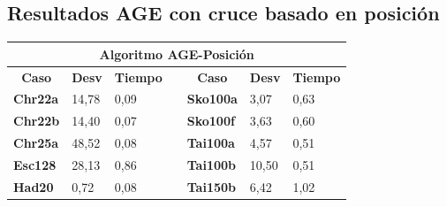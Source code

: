 \documentclass[a4paper, 12pt]{article}
\begin{document}
      
      \newpage
      \subsection{Resultados AGE con cruce basado en posición}
      \begin{table}[H]
\centering
\label{my-label}
\begin{tabular}{|l|l|l|l|l|l|l|}
\hline
\multicolumn{7}{|c|}{\textbf{Algoritmo AGE-Posición}}                                                                                                                                                                                                                   \\ \hline
\multicolumn{1}{|c|}{\textbf{Caso}} & \multicolumn{1}{c|}{\textbf{Desv}} & \multicolumn{1}{c|}{\textbf{Tiempo}} & \multicolumn{1}{c|}{\textbf{}} & \multicolumn{1}{c|}{\textbf{Caso}} & \multicolumn{1}{c|}{\textbf{Desv}} & \multicolumn{1}{c|}{\textbf{Tiempo}} \\ \cline{1-3} \cline{5-7} 
\textbf{Chr22a}                     & 14,78                              & 0,09                                 &                                & \textbf{Sko100a}                   & 3,07                               & 0,63                                 \\ \cline{1-3} \cline{5-7} 
\textbf{Chr22b}                     & 14,40                              & 0,07                                 &                                & \textbf{Sko100f}                   & 3,63                               & 0,60                                 \\ \cline{1-3} \cline{5-7} 
\textbf{Chr25a}                     & 48,52                              & 0,08                                 &                                & \textbf{Tai100a}                   & 4,57                               & 0,51                                 \\ \cline{1-3} \cline{5-7} 
\textbf{Esc128}                     & 28,13                              & 0,86                                 &                                & \textbf{Tai100b}                   & 10,50                              & 0,51                                 \\ \cline{1-3} \cline{5-7} 
\textbf{Had20}                      & 0,72                               & 0,08                                 &                                & \textbf{Tai150b}                   & 6,42                               & 1,02                                 \\ \cline{1-3} \cline{5-7} 

\end{tabular}
\end{table}
\end{document}
